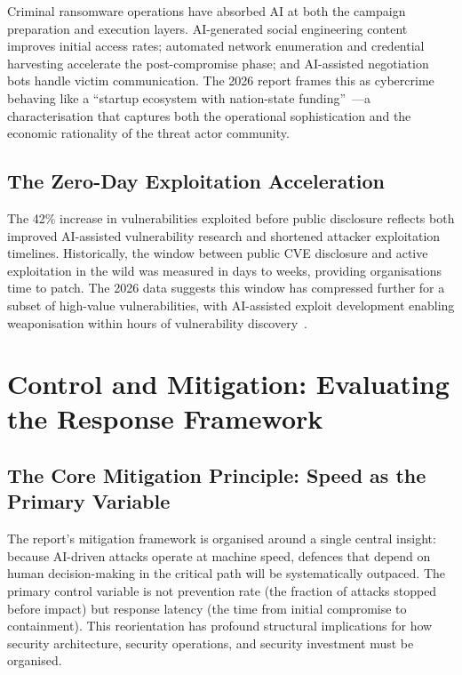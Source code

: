 \documentclass[journal]{IEEEtran}
\begin{document}
Criminal ransomware operations have absorbed AI at both the campaign preparation
and execution layers. AI-generated social engineering content improves initial access
rates; automated network enumeration and credential harvesting accelerate the
post-compromise phase; and AI-assisted negotiation bots handle victim communication.
The 2026 report frames this as cybercrime behaving like a ``startup ecosystem with
nation-state funding''~\cite{cs2026press}---a characterisation that captures both
the operational sophistication and the economic rationality of the threat actor
community.

\subsection{The Zero-Day Exploitation Acceleration}

The 42\% increase in vulnerabilities exploited before public disclosure reflects both
improved AI-assisted vulnerability research and shortened attacker exploitation
timelines. Historically, the window between public CVE disclosure and active
exploitation in the wild was measured in days to weeks, providing organisations time
to patch. The 2026 data suggests this window has compressed further for a subset of
high-value vulnerabilities, with AI-assisted exploit development enabling weaponisation
within hours of vulnerability discovery~\cite{cs2026exec}.

\section{Control and Mitigation: Evaluating the Response Framework}

\subsection{The Core Mitigation Principle: Speed as the Primary Variable}

The report's mitigation framework is organised around a single central
insight: because AI-driven attacks operate at machine speed, defences that depend
on human decision-making in the critical path will be systematically outpaced.
The primary control variable is not prevention rate (the fraction of attacks stopped
before impact) but response latency (the time from initial compromise to containment).
This reorientation has profound structural implications for how security
architecture, security operations, and security investment must be organised.
\end{document}
